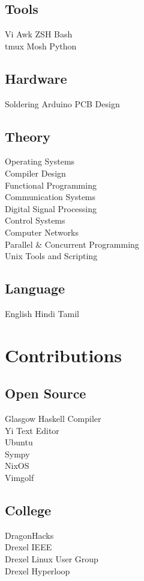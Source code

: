\documentclass[]{deedy}
\begin{document}
\begin{minipage}[t]{0.33\textwidth}
\sectionsep
\subsection{Tools}
Vi \textbullet{} Awk \textbullet{} ZSH \textbullet{} Bash \\
tmux \textbullet{} Mosh \textbullet{} Python
\sectionsep

\subsection{Hardware}
Soldering \textbullet{} Arduino \textbullet{} PCB Design
\sectionsep

\subsection{Theory}
Operating Systems \\
Compiler Design \\
Functional Programming \\
Communication Systems \\
Digital Signal Processing \\
Control Systems \\
Computer Networks \\
Parallel \& Concurrent Programming \\
Unix Tools and Scripting
\sectionsep

\subsection{Language}
English \textbullet{} Hindi \textbullet{} Tamil


\section{Contributions}
\subsection{Open Source}
Glasgow Haskell Compiler \\
Yi Text Editor \\
Ubuntu \\
Sympy \\
NixOS \\
Vimgolf
\sectionsep

\subsection{College}
DragonHacks \\
Drexel IEEE \\
Drexel Linux User Group \\
Drexel Hyperloop
\sectionsep

%
%

\end{minipage} 
\end{document}

